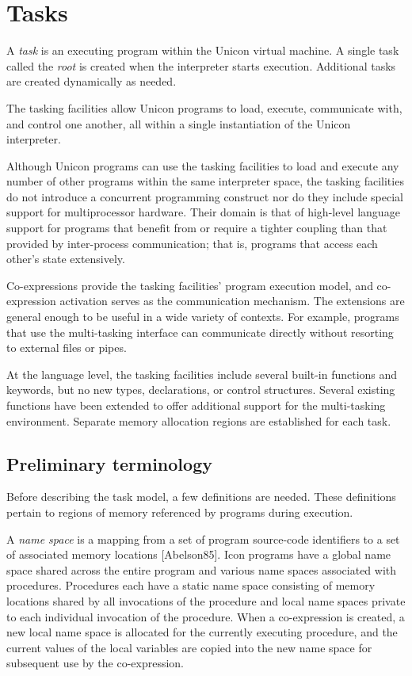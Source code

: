 \section{Tasks}

A {\em task\/} is an executing program within the Unicon virtual
machine. A single task called the {\em root\/} is created
when the interpreter starts execution. Additional tasks are created
dynamically as needed.

The tasking facilities allow Unicon programs to load, execute,
communicate with, and control one another, all within a single
instantiation of the Unicon interpreter. 

Although Unicon programs can use the tasking facilities to load and
execute any number of other programs within the same interpreter space,
the tasking facilities do not introduce a concurrent programming
construct nor do they include special support for multiprocessor
hardware. Their domain is that of high-level language support for
programs that benefit from or require a tighter coupling than that
provided by inter-process communication; that is, programs that access
each other's state extensively.

Co-expressions provide the tasking facilities' program
execution model, and co-expression activation serves as the
communication mechanism. The extensions are general enough to be useful
in a wide variety of contexts. For example, programs that use the
multi-tasking interface can communicate directly without resorting to
external files or pipes.

At the language level, the tasking facilities include several
built-in functions and keywords, but no new types, declarations, or
control structures. Several existing functions have been extended to
offer additional support for the multi-tasking environment. 
Separate memory allocation regions are established for each task. 

\subsection*{Preliminary terminology}

Before describing the task model, a few definitions are needed. These
definitions pertain to regions of memory referenced by programs during
execution. 

A \textit{name space} is a mapping from a set of program source-code
identifiers to a set of associated memory locations [Abelson85]. Icon
programs have a global name space shared across the entire program and
various name spaces associated with procedures. Procedures each have a
static name space consisting of memory locations shared by all
invocations of the procedure and local name spaces private to each
individual invocation of the procedure.
When a co-expression is created, a new local name space is allocated for
the currently executing procedure, and the current values of the local
variables are copied into the new name space for subsequent use by the
co-expression. 

